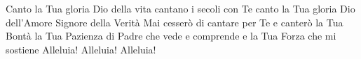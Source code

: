 \beginverse
Canto la Tua gloria Dio della vita
cantano i secoli con Te
canto la Tua gloria Dio dell'Amore
Signore della Verità
Mai cesserò di cantare per Te
e canterò la Tua Bontà
la Tua Pazienza di Padre che vede e comprende
e la Tua Forza che mi sostiene
Alleluia! Alleluia! Alleluia!
\endverse
\endsong

